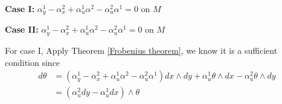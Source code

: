 \documentclass[../main.tex]{subfiles}
\begin{document}
\begin{example}
\textbf{Case I: }$\alpha^1_y-\alpha^2_x+\alpha^1_u\alpha^2-\alpha^2_u\alpha^1=0$ on $M$ \par
\textbf{Case II: }$\alpha^1_y-\alpha^2_x+\alpha^1_u\alpha^2-\alpha^2_u\alpha^1=0$ on $M$ \par
For case I, Apply Theorem \ref{Frobenius theorem}, we know it is a sufficient condition since
\begin{align*}
d\theta &=(\alpha^1_y-\alpha^2_x+\alpha^1_u\alpha^2-\alpha^2_u\alpha^1)dx\wedge dy+\alpha^1_u\theta\wedge dx-\alpha^2_u\theta\wedge dy \\
&=(\alpha^2_udy-\alpha^1_udx)\wedge\theta
\end{align*}
\end{example}
\end{document}

